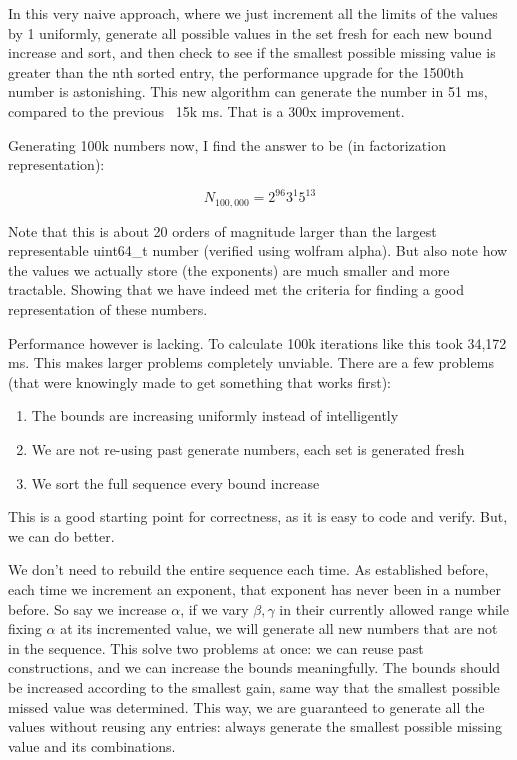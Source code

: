 \documentclass{article}
\begin{document}
In this very naive approach, where we just increment all the limits of the values by 1 uniformly, generate all possible values in the set fresh for each new bound increase and sort, and then check to see if the smallest possible missing value is greater than the nth sorted entry, the performance upgrade for the 1500th number is astonishing. This new algorithm can generate the number in 51 ms, compared to the previous ~15k ms. That is a 300x improvement. \newline

Generating 100k numbers now, I find the answer to be (in factorization representation):

\begin{equation}
    N_{100,000} = 2^{96}3^{1}5^{13}
\end{equation}

Note that this is about 20 orders of magnitude larger than the largest representable uint64\_t number (verified using wolfram alpha). But also note how the values we actually store (the exponents) are much smaller and more tractable. Showing that we have indeed met the criteria for finding a good representation of these numbers. \newline

Performance however is lacking. To calculate 100k iterations like this took 34,172 ms. This makes larger problems completely unviable. There are a few problems (that were knowingly made to get something that works first):

\begin{enumerate}
    \item The bounds are increasing uniformly instead of intelligently
    \item We are not re-using past generate numbers, each set is generated fresh
    \item We sort the full sequence every bound increase
\end{enumerate}

This is a good starting point for correctness, as it is easy to code and verify. But, we can do better. \newline

We don't need to rebuild the entire sequence each time. As established before, each time we increment an exponent, that exponent has never been in a number before. So say we increase $\alpha$, if we vary $\beta, \gamma$ in their currently allowed range while fixing $\alpha$ at its incremented value, we will generate all new numbers that are not in the sequence. This solve two problems at once: we can reuse past constructions, and we can increase the bounds meaningfully. The bounds should be increased according to the smallest gain, same way that the smallest possible missed value was determined. This way, we are guaranteed to generate all the values without reusing any entries: always generate the smallest possible missing value and its combinations. \newline
\end{document}
